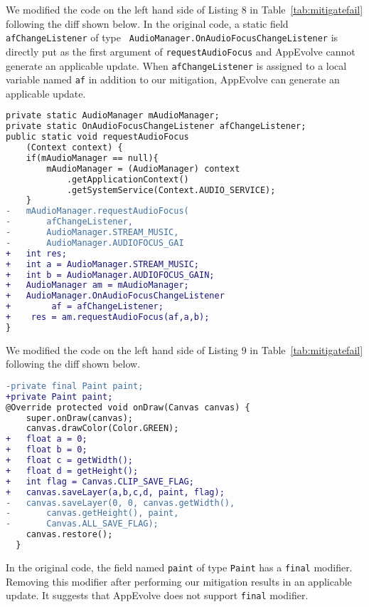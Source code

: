 We modified the code on the left hand side of Listing 8 in
Table~\ref{tab:mitigatefail} following the diff shown below. In the
original code, a static field {\tt afChangeListener} of type {\tt
  Audio\-Manager.OnAudioFocusChangeListener} is directly put as the first
argument of {\tt requestAudioFocus} and AppEvolve cannot generate an
applicable update. When {\tt afChangeListener} is assigned to a local
variable named {\tt af} in addition to our mitigation, AppEvolve can
generate an applicable update.

\begin{lstlisting}[language=diff,numbers=none]
private static AudioManager mAudioManager;
private static OnAudioFocusChangeListener afChangeListener;
public static void requestAudioFocus
    (Context context) {
    if(mAudioManager == null){
        mAudioManager = (AudioManager) context
            .getApplicationContext()
            .getSystemService(Context.AUDIO_SERVICE);
    }
-   mAudioManager.requestAudioFocus(
-       afChangeListener,
-       AudioManager.STREAM_MUSIC,
-       AudioManager.AUDIOFOCUS_GAI
+   int res;
+   int a = AudioManager.STREAM_MUSIC;
+   int b = AudioManager.AUDIOFOCUS_GAIN;
+   AudioManager am = mAudioManager;
+   AudioManager.OnAudioFocusChangeListener
+        af = afChangeListener;
+    res = am.requestAudioFocus(af,a,b);
}
\end{lstlisting}

\vspace{\baselineskip}

We modified the code on the left hand side of Listing 9 in
Table~\ref{tab:mitigatefail} following the diff shown below.

\begin{lstlisting}[language=diff,numbers=none]
-private final Paint paint;
+private Paint paint;
@Override protected void onDraw(Canvas canvas) {
    super.onDraw(canvas);
    canvas.drawColor(Color.GREEN);
+   float a = 0;
+   float b = 0;
+   float c = getWidth();
+   float d = getHeight();
+   int flag = Canvas.CLIP_SAVE_FLAG;
+   canvas.saveLayer(a,b,c,d, paint, flag);
-   canvas.saveLayer(0, 0, canvas.getWidth(),
-       canvas.getHeight(), paint,
-       Canvas.ALL_SAVE_FLAG);
    canvas.restore();
  }
\end{lstlisting}

\vspace{\baselineskip}

In the original code, the field named {\tt paint} of type {\tt Paint} has a
{\tt final} modifier. Removing this modifier after performing our
mitigation results in an applicable update. It suggests that AppEvolve does
not support {\tt final} modifier.

